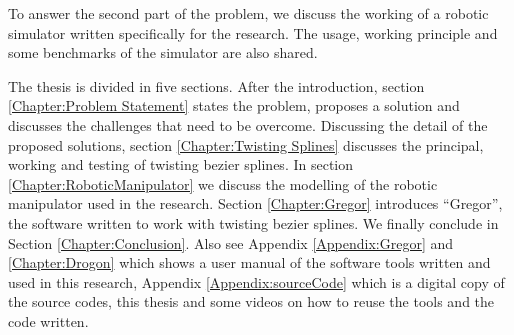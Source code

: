 {    To answer the second part of the problem, we discuss the working of a robotic simulator written specifically for the research. The usage, working principle and some benchmarks of the simulator are also shared.

    The thesis is divided in five sections. After the introduction, section \ref{Chapter:Problem Statement} states the problem, proposes a solution and discusses the challenges that need to be overcome. Discussing the detail of the proposed solutions, section \ref{Chapter:Twisting Splines} discusses the principal, working and testing of twisting bezier splines. In section \ref{Chapter:RoboticManipulator} we discuss the modelling of the robotic manipulator used in the research. Section \ref{Chapter:Gregor} introduces ``Gregor'', the software written to work with twisting bezier splines. %
    We finally conclude in Section \ref{Chapter:Conclusion}. Also see Appendix \ref{Appendix:Gregor} and \ref{Chapter:Drogon} which shows a user manual of the software tools written and used in this research, Appendix \ref{Appendix:sourceCode} which is a digital copy of the source codes, this thesis and some videos on how to reuse the tools and the code written.
} 
